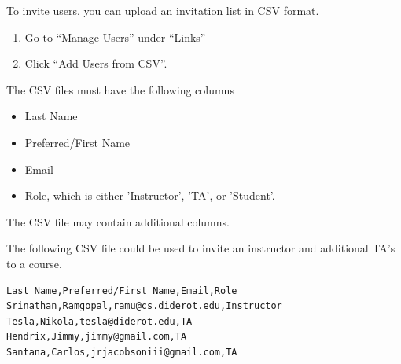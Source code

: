 To invite users, you can upload an invitation list in CSV format. 
%
\begin{enumerate}
\item
Go to ``Manage Users'' under ``Links'' 
\item
Click ``Add Users from CSV''.
\end{enumerate}
%
The CSV files must have the following columns
\begin{itemize}
\item Last Name
\item Preferred/First Name
\item Email
\item Role, which is either 'Instructor', 'TA', or 'Student'. 
\end{itemize} 
%
The CSV file may contain additional columns.

\begin{example}
The following CSV file could be used to invite an instructor and additional TA's to a course.

\begin{lstlisting}
Last Name,Preferred/First Name,Email,Role
Srinathan,Ramgopal,ramu@cs.diderot.edu,Instructor
Tesla,Nikola,tesla@diderot.edu,TA
Hendrix,Jimmy,jimmy@gmail.com,TA
Santana,Carlos,jrjacobsoniii@gmail.com,TA
\end{lstlisting}

\end{example}
